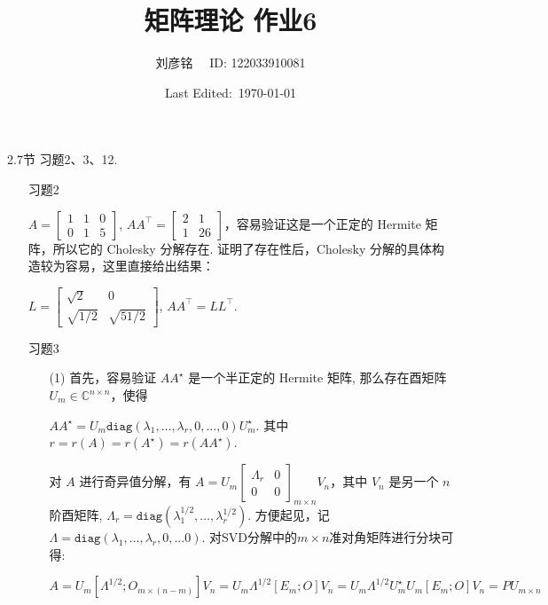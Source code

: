 \documentclass{article}
\title{矩阵理论 作业6}
\author{刘彦铭 \ \ ID: 122033910081}
\date{Last Edited:\ \today}
\begin{document}
\maketitle

2.7节 习题2、3、12.

\begin{spacing}{1.5}

\begin{itemize}
    \item [习题2]
    
    $A = \left[\begin{array}{ccc}1&1&0\\0&1&5\end{array}\right]$, $AA^\top = \left[\begin{array}{cc}2&1\\1&26\end{array}\right]$，容易验证这是一个正定的 Hermite 矩阵，所以它的 Cholesky 分解存在. 证明了存在性后，Cholesky 分解的具体构造较为容易，这里直接给出结果：
    
    $L = \left[\begin{array}{cc}\sqrt{2} & 0 \\ \sqrt{1/2} & \sqrt{51/2}\end{array}\right]$, $AA^\top = LL^\top$.

    \item [习题3] 
    
    \begin{itemize}
        \item [(1)] 首先，容易验证 $AA^\star$ 是一个半正定的 Hermite 矩阵, 那么存在酉矩阵$U_m\in\mathbb{C}^{n\times n}$，使得
        
        $AA^\star = U_m \mathtt{diag}(\lambda_1, \dots, \lambda_r, 0, \dots, 0) U_m^\star$. 其中 $r = r(A) = r(A^\star) = r(AA^\star)$. 
        
        对 $A$ 进行奇异值分解，有 $A = U_m\left[\begin{array}{cc}\Lambda_r&0\\0&0\end{array}\right]_{m\times n} V_n$，其中 $V_n$ 是另一个 $n$ 阶酉矩阵, $\Lambda_r = \mathtt{diag}(\lambda_1^{1/2},\dots, \lambda_r^{1/2})$. 方便起见，记 $\Lambda = \mathtt{diag}(\lambda_1, \dots, \lambda_r, 0,\dots 0)$. 对SVD分解中的$m\times n$准对角矩阵进行分块可得: 
        
        $$A = U_m \left[ \Lambda^{1/2} ; O_{m\times (n - m)} \right] V_n = U_m \Lambda^{1/2}\left[E_m; O\right]V_n = U_m \Lambda^{1/2} U_m^\star U_m [E_m; O] V_n = PU_{m\times n} $$


\end{itemize}
\end{itemize}
\end{spacing}
\end{document}
